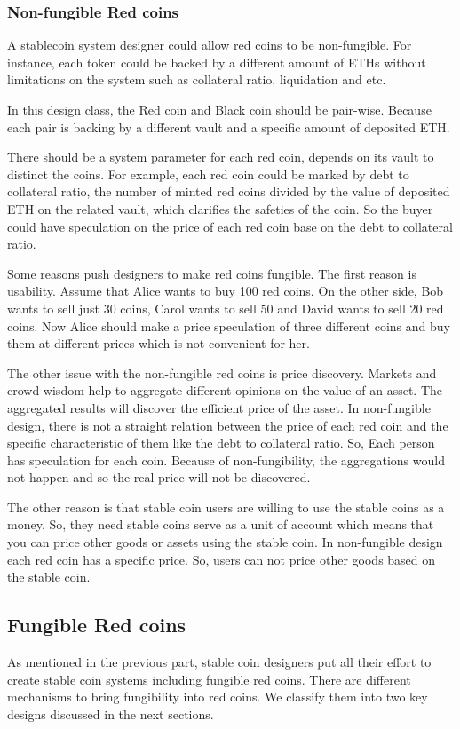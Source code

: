 \subsubsection{Non-fungible Red coins}
A stablecoin system designer could allow red coins to be non-fungible. For instance, each token could be backed by a different amount of ETHs without limitations on the system such as collateral ratio, liquidation and etc.

In this design class, the Red coin and Black coin should be pair-wise. Because each pair is backing by a different vault and a specific amount of deposited ETH.

There should be a system parameter for each red coin, depends on its vault to distinct the coins.
For example, each red coin could be marked by debt to collateral ratio, the number of minted red coins divided by the value of deposited ETH on the related vault, which clarifies the safeties of the coin.
So the buyer could have speculation on the price of each red coin base on the debt to collateral ratio.

Some reasons push designers to make red coins fungible. The first reason is usability. Assume that Alice wants to buy 100 red coins. On the other side, Bob wants to sell just 30 coins, Carol wants to sell 50 and David wants to sell 20 red coins. Now Alice should make a price speculation of three different coins and buy them at different prices which is not convenient for her.

The other issue with the non-fungible red coins is price discovery. Markets and crowd wisdom help to aggregate different opinions on the value of an asset. The aggregated results will discover the efficient price of the asset. In non-fungible design, there is not a straight relation between the price of each red coin and the specific characteristic of them like the debt to collateral ratio. So, Each person has speculation for each coin. Because of non-fungibility, the aggregations would not happen and so the real price will not be discovered.

The other reason is that stable coin users are willing to use the stable coins as a money. So, they need stable coins serve as a unit of account which means that you can price other goods or assets using the stable coin. In non-fungible design each red coin has a specific price. So, users can not price other goods based on the stable coin.


\subsection{Fungible Red coins}
As mentioned in the previous part, stable coin designers put all their effort to create stable coin systems including fungible red coins. There are different mechanisms to bring fungibility into red coins. We classify them into two key designs discussed in the next sections.


